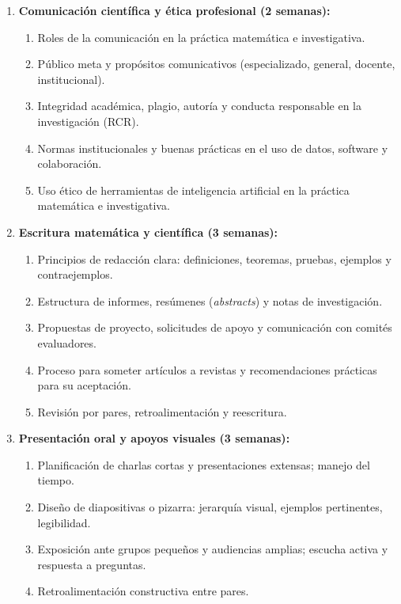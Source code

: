 \begin{refsection}
\begin{enumerate}

\item \textbf{Comunicación científica y ética profesional (2 semanas):}
\begin{enumerate}
    \item Roles de la comunicación en la práctica matemática e investigativa.
    \item Público meta y propósitos comunicativos (especializado, general, docente, institucional).
    \item Integridad académica, plagio, autoría y conducta responsable en la investigación (RCR).
    \item Normas institucionales y buenas prácticas en el uso de datos, software y colaboración.
    \item Uso ético de herramientas de inteligencia artificial en la práctica matemática e investigativa.
\end{enumerate}

\item \textbf{Escritura matemática y científica (3 semanas):}
\begin{enumerate}
    \item Principios de redacción clara: definiciones, teoremas, pruebas, ejemplos y contraejemplos.
    \item Estructura de informes, resúmenes (\emph{abstracts}) y notas de investigación.
    \item Propuestas de proyecto, solicitudes de apoyo y comunicación con comités evaluadores.
    \item Proceso para someter artículos a revistas y recomendaciones prácticas para su aceptación.
    \item Revisión por pares, retroalimentación y reescritura.
\end{enumerate}


\item \textbf{Presentación oral y apoyos visuales (3 semanas):}
\begin{enumerate}
    \item Planificación de charlas cortas y presentaciones extensas; manejo del tiempo.
    \item Diseño de diapositivas o pizarra: jerarquía visual, ejemplos pertinentes, legibilidad.
    \item Exposición ante grupos pequeños y audiencias amplias; escucha activa y respuesta a preguntas.
    \item Retroalimentación constructiva entre pares.
\end{enumerate}


\end{enumerate}
\end{refsection}
